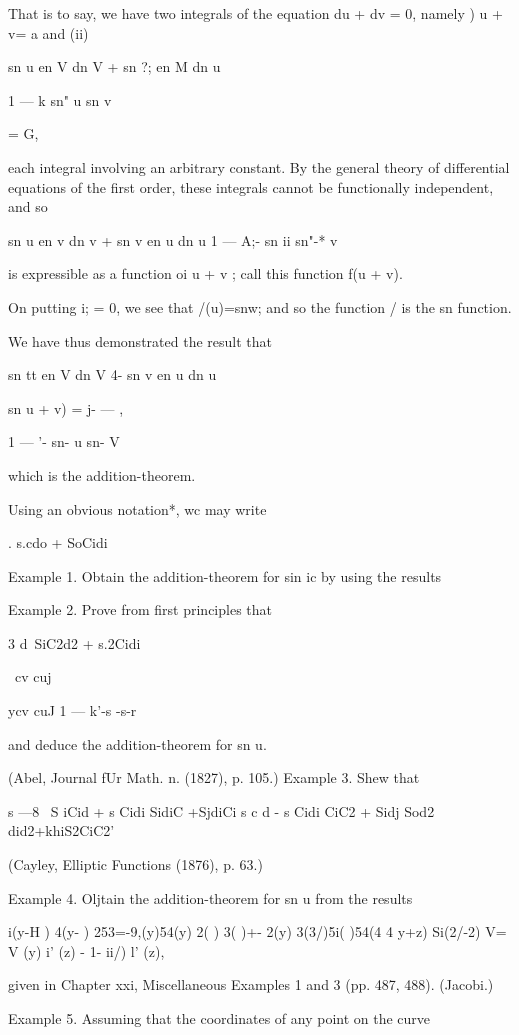 That is to say, we have two integrals of the equation du + dv = 0,
namely ) u + v= a and (ii)

sn u en V dn V + sn ?; en M dn u

1 — k sn" u sn v

= G,

each integral involving an arbitrary constant. By the general theory
of differential equations of the first order, these integrals cannot
be functionally independent, and so

sn u en v dn v + sn v en u dn u 1 — A;- sn ii sn"-* v

is expressible as a function oi u + v ; call this function f(u + v).

On putting i; = 0, we see that /(u)=snw; and so the function / is the
sn function.

We have thus demonstrated the result that

sn tt en V dn V 4- sn v en u dn u

sn u + v) = j- — ,

1 — '- sn- u sn- V

which is the addition-theorem.

Using an obvious notation*, wc may write

. s.cdo + SoCidi

Example 1. Obtain the addition-theorem for sin ic by using the results

Example 2. Prove from first principles that

3 d\ SiC2d2 + s.2Cidi\

\ cv cuj

ycv cuJ 1 — k'-s -s-r

and deduce the addition-theorem for sn u.

(Abel, Journal fUr Math. n. (1827), p. 105.) Example 3. Shew that

s —8 \ S iCid + s Cidi SidiC +SjdiCi s c d - s Cidi CiC2 + Sidj Sod2
did2+khiS2CiC2'

(Cayley, Elliptic Functions (1876), p. 63.)

Example 4. Oljtain the addition-theorem for sn u from the results

 i(y-H ) 4(y- ) 253=-9,(y)54(y) 2( ) 3( )+- 2(y) 3(3/)5i( )54(4 4 y+z)
Si(2/-2) V= V (y) i' (z) - 1- ii/) l' (z),

given in Chapter xxi, Miscellaneous Examples 1 and 3 (pp. 487, 488).
(Jacobi.)

Example 5. Assuming that the coordinates of any point on the curve


